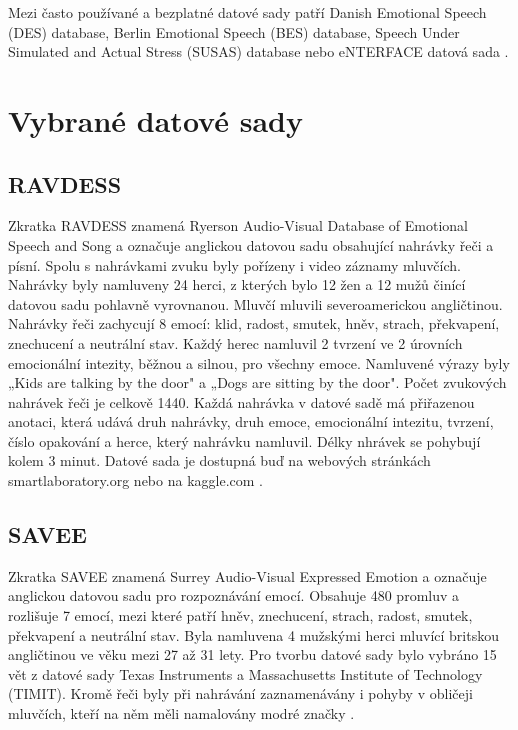 \documentclass[FM,BP]{tulthesis}
\begin{document}
Mezi často používané a bezplatné datové sady patří Danish Emotional Speech (DES) database, Berlin Emotional Speech (BES) database, Speech Under Simulated and Actual Stress (SUSAS) database nebo eNTERFACE datová sada \cite{konar_chakraborty_2015}.

\section{Vybrané datové sady}

\subsection{RAVDESS}
Zkratka RAVDESS \cite{Livingstone2018} znamená Ryerson Audio-Visual Database of Emotional Speech and Song a označuje anglickou datovou sadu obsahující nahrávky řeči a písní. Spolu s nahrávkami zvuku byly pořízeny i video záznamy mluvčích. Nahrávky byly namluveny 24 herci, z kterých bylo 12 žen a 12 mužů činící datovou sadu pohlavně vyrovnanou. Mluvčí mluvili severoamerickou angličtinou. Nahrávky řeči zachycují 8 emocí: klid, radost, smutek, hněv, strach, překvapení, znechucení a neutrální stav. Každý herec namluvil 2 tvrzení ve 2 úrovních emocionální intezity, běžnou a silnou, pro všechny emoce. Namluvené výrazy byly „Kids are talking by the door" a „Dogs are sitting by the door". Počet zvukových nahrávek řeči je celkově 1440. Každá nahrávka v datové sadě má přiřazenou anotaci, která udává druh nahrávky, druh emoce, emocionální intezitu, tvrzení, číslo opakování a herce, který nahrávku namluvil. Délky nhrávek se pohybují kolem 3 minut. Datové sada je dostupná buď na webových stránkách smartlaboratory.org nebo na kaggle.com \cite{smart_lab}.

\subsection{SAVEE}
Zkratka SAVEE znamená Surrey Audio-Visual Expressed Emotion a označuje anglickou datovou sadu pro rozpoznávání emocí. Obsahuje 480 promluv a rozlišuje 7 emocí, mezi které patří hněv, znechucení, strach, radost, smutek, překvapení a neutrální stav. Byla namluvena 4 mužskými herci mluvící britskou angličtinou ve věku mezi 27 až 31 lety. Pro tvorbu datové sady bylo vybráno 15 vět z datové sady Texas Instruments a Massachusetts Institute of Technology (TIMIT). Kromě řeči byly při nahrávání zaznamenávány i pohyby v obličeji mluvčích, kteří na něm měli namalovány modré značky \cite{savee}.
\end{document}
